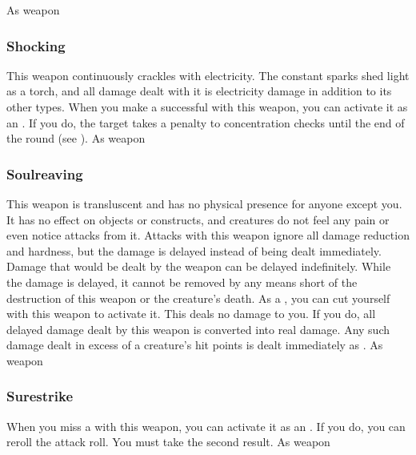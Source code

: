  
 As weapon
\lowercase{\hypertarget{item:Shocking}{}}\label{item:Shocking}
\hypertarget{item:Shocking}{\subsubsection{Shocking\hfill{}}}
This weapon continuously crackles with electricity.
The constant sparks shed light as a torch, and all damage dealt with it is electricity damage in addition to its other types.
When you make a successful  with this weapon, you can activate it as an .
If you do, the target takes a  penalty to concentration checks until the end of the round (see ).
 
 As weapon
\lowercase{\hypertarget{item:Soulreaving}{}}\label{item:Soulreaving}
\hypertarget{item:Soulreaving}{\subsubsection{Soulreaving\hfill{}}}
This weapon is transluscent and has no physical presence for anyone except you.
It has no effect on objects or constructs, and creatures do not feel any pain or even notice attacks from it.
Attacks with this weapon ignore all damage reduction and hardness, but the damage is delayed instead of being dealt immediately.
Damage that would be dealt by the weapon can be delayed indefinitely.
While the damage is delayed, it cannot be removed by any means short of the destruction of this weapon or the creature's death.
As a , you can cut yourself with this weapon to activate it.
This deals no damage to you.
If you do, all delayed damage dealt by this weapon is converted into real damage.
Any such damage dealt in excess of a creature's hit points is dealt immediately as .
 As weapon
\lowercase{\hypertarget{item:Surestrike}{}}\label{item:Surestrike}
\hypertarget{item:Surestrike}{\subsubsection{Surestrike\hfill{}}}
When you miss a  with this weapon, you can activate it as an .
If you do, you can reroll the attack roll.
You must take the second result.
 
 As weapon
\lowercase{\hypertarget{item:Thieving}{}}\label{item:Thieving}
